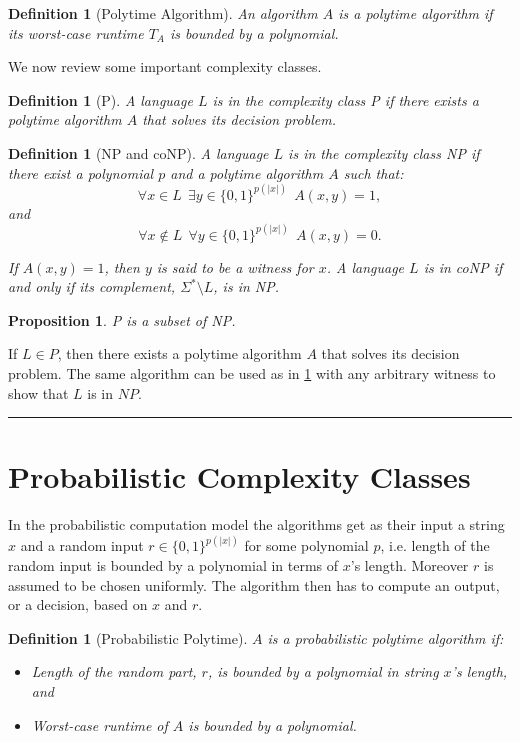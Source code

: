 \documentclass[a4paper,10pt]{article}
\newtheorem{proposition}[theorem]{Proposition}
\newtheorem{definition}[theorem]{Definition}
\newenvironment{proof}{{\bf Proof:}}{\hfill\rule{2mm}{2mm}}
\begin{document}
\begin{definition}[Polytime Algorithm]
An algorithm $A$ is a polytime algorithm if its worst-case runtime $T_A$ is bounded by a polynomial.
\end{definition}

We now review some important complexity classes.
\begin{definition}[P] \label{pdef} A language $L$ is in the complexity class P if there exists a polytime algorithm $A$ that solves its decision problem.

\end{definition}

\begin{definition}[NP and coNP]\label{npdef} A language $L$ is in the complexity class NP if there exist a polynomial $p$ and a polytime algorithm $A$ such that:
$$\forall x \in L ~~ \exists y \in \{0, 1\}^{p(\vert x \vert )} ~~ A(x, y) = 1,$$ and 
$$\forall x \not \in L ~~ \forall y \in \{0, 1\}^{p(\vert x \vert )} ~~ A(x, y) = 0.$$

If $A(x, y) = 1$, then $y$ is said to be a witness for $x$. A language $L$ is in coNP if and only if its complement, $\Sigma^* \setminus L$, is in NP.

\end{definition}

\begin{proposition}
P is a subset of NP.
\end{proposition}
\begin{proof}
If $L \in P$, then there exists a polytime algorithm $A$ that solves its decision problem. The same algorithm can be used as in \ref{npdef} with any arbitrary witness to show that $L$ is in $NP$.
\end{proof}

\section{Probabilistic Complexity Classes}
In the probabilistic computation model the algorithms get as their input a string $x$ and a random input $r \in \{0, 1\}^{p(\vert x \vert)}$ for some polynomial $p$, i.e. length of the random input is bounded by a polynomial in terms of $x$'s length. Moreover $r$ is assumed to be chosen uniformly. The algorithm then has to compute an output, or a decision, based on $x$ and $r$.

\begin{definition}[Probabilistic Polytime]
$A$ is a probabilistic polytime algorithm if:
\begin{itemize}
\item Length of the random part, $r$, is bounded by a polynomial in string $x$'s length, and
\item Worst-case runtime of $A$ is bounded by a polynomial.
\end{itemize}
\end{definition}
\end{document}
